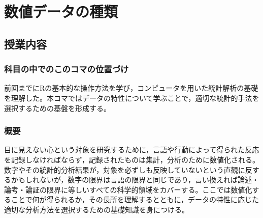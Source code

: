 \section{数値データの種類}
\label{b02_Number_and_data}

\subsection{授業内容}
\subsubsection{科目の中でのこのコマの位置づけ}
前回までにRの基本的な操作方法を学び，コンピュータを用いた統計解析の基礎を理解した。本コマではデータの特性について学ぶことで，適切な統計的手法を選択するための基盤を形成する。
\subsubsection{概要}
目に見えない心という対象を研究するために，言語や行動によって得られた反応を記録しなければならず，記録されたものは集計，分析のために数値化される。数字やその統計的分析結果が，対象を必ずしも反映していないという直観に反するかもしれないが，数字の限界は言語の限界と同じであり，言い換えれば論述・論考・論証の限界に等しいすべての科学的領域をカバーする。ここでは数値化することで何が得られるか，その長所を理解するとともに，データの特性に応じた適切な分析方法を選択するための基礎知識を身につける。
